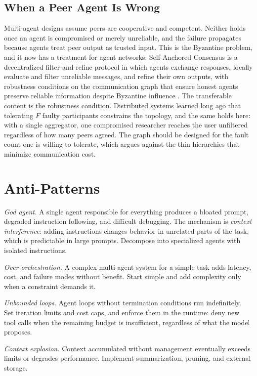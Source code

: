 \documentclass[11pt]{book}
\begin{document}
\subsection{When a Peer Agent Is Wrong}

Multi-agent designs assume peers are cooperative and competent. Neither holds once an agent is compromised or merely unreliable, and the failure propagates because agents treat peer output as trusted input. This is the Byzantine problem, and it now has a treatment for agent networks: Self-Anchored Consensus is a decentralized filter-and-refine protocol in which agents exchange responses, locally evaluate and filter unreliable messages, and refine their own outputs, with robustness conditions on the communication graph that ensure honest agents preserve reliable information despite Byzantine influence \cite{byzantine2026}. The transferable content is the robustness condition. Distributed systems learned long ago that tolerating $F$ faulty participants constrains the topology, and the same holds here: with a single aggregator, one compromised researcher reaches the user unfiltered regardless of how many peers agreed. The graph should be designed for the fault count one is willing to tolerate, which argues against the thin hierarchies that minimize communication cost.

\section{Anti-Patterns}

\textit{God agent.} A single agent responsible for everything produces a bloated prompt, degraded instruction following, and difficult debugging. The mechanism is \textit{context interference}: adding instructions changes behavior in unrelated parts of the task, which is predictable in large prompts. Decompose into specialized agents with isolated instructions.

\textit{Over-orchestration.} A complex multi-agent system for a simple task adds latency, cost, and failure modes without benefit. Start simple and add complexity only when a constraint demands it.

\textit{Unbounded loops.} Agent loops without termination conditions run indefinitely. Set iteration limits and cost caps, and enforce them in the runtime: deny new tool calls when the remaining budget is insufficient, regardless of what the model proposes.

\textit{Context explosion.} Context accumulated without management eventually exceeds limits or degrades performance. Implement summarization, pruning, and external storage.
\end{document}
